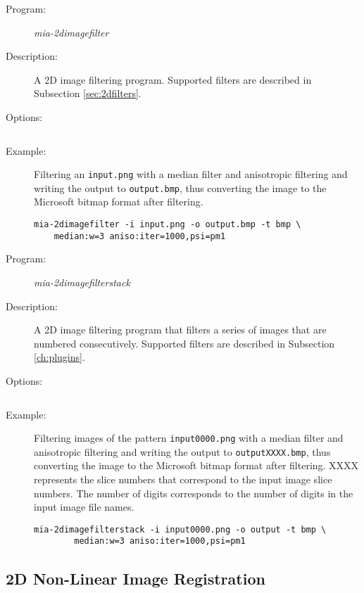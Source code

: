 \begin{description}
\item [Program:]\emph{mia-2dimagefilter}
\item [Description:]A 2D image filtering program. Supported filters are described in Subsection \ref{sec:2dfilters}. 
\item [Options:] $\:$

\tabstart
\optinfile
\optoutfile
\opttypetwod
\opthelpplugin
\tabend
\item [Example:] Filtering an \texttt{input.png} with a median filter and anisotropic filtering and writing the output to \texttt{output.bmp}, 
		thus converting the image to the Microsoft bitmap format after filtering. 
\begin{lstlisting}
mia-2dimagefilter -i input.png -o output.bmp -t bmp \
	median:w=3 aniso:iter=1000,psi=pm1
\end{lstlisting}
\end{description}

\begin{description}
\item [Program:]\emph{mia-2dimagefilterstack}
\item [Description:]A 2D image filtering program that filters a series of images that are numbered consecutively. 
              Supported filters are described in Subsection \ref{ch:plugins}. 
\item [Options:] $\:$

\tabstart
\optinfile
\optoutbase
\opttypetwod
\opthelpplugin
\tabend
\item [Example:] Filtering images of the pattern \texttt{input0000.png} with a median filter and anisotropic 
                 filtering and writing the output to \texttt{outputXXXX.bmp}, thus converting the image to the Microsoft 
                 bitmap format after filtering. 
		 XXXX represents the slice numbers that correspond to the input image slice numbers. 
                 The number of digits corresponds to the number of digits in the input image file names. 
\begin{lstlisting}
mia-2dimagefilterstack -i input0000.png -o output -t bmp \
        median:w=3 aniso:iter=1000,psi=pm1
\end{lstlisting}
\end{description}


\subsection{2D Non-Linear Image Registration}
\label{sec:reg2d}

